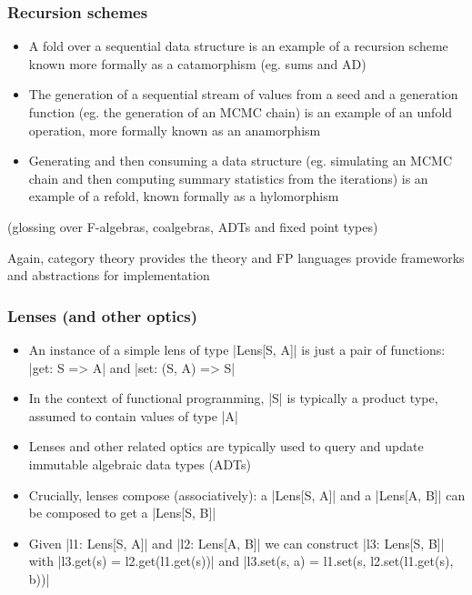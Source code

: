 \documentclass[mathserif,handout]{beamer}
\begin{document}
\begin{frame}
  \frametitle{Recursion schemes}
  \begin{itemize}
  \item A \alert{fold} over a sequential data structure is an example of a recursion scheme known more formally as a \alert{catamorphism} (eg. sums and AD)
  \item The generation of a sequential stream of values from a seed and a generation function (eg. the generation of an MCMC chain) is an example of an \alert{unfold} operation, more formally known as an \alert{anamorphism}
    \item Generating and then consuming a data structure (eg. simulating an MCMC chain and then computing summary statistics from the iterations) is an example of a \alert{refold}, known formally as a \alert{hylomorphism}
  \end{itemize}
  (glossing over \alert{F-algebras}, \alert{coalgebras}, \alert{ADTs} and \alert{fixed point types})
  \medskip
  
  Again, category theory provides the theory and FP languages provide frameworks and abstractions for implementation
\end{frame}


\begin{frame}[fragile]
  \frametitle{Lenses (and other optics)}
  \begin{itemize}
  \item An instance of a simple \alert{lens} of type |Lens[S, A]| is just a pair of functions: |get: S => A| and |set: (S, A) => S|
  \item In the context of functional programming, |S| is typically a product type, assumed to contain values of type |A|
  \item Lenses and other related optics are typically used to query and update immutable algebraic data types (ADTs)
  \item Crucially, lenses \alert{compose} (associatively): a |Lens[S, A]| and a |Lens[A, B]| can be composed to get a |Lens[S, B]|
    \item Given |l1: Lens[S, A]| and |l2: Lens[A, B]| we can construct |l3: Lens[S, B]| with |l3.get(s) = l2.get(l1.get(s))| and |l3.set(s, a) = l1.set(s, l2.set(l1.get(s), b))|
    \end{itemize}
\end{frame}
\end{document}
